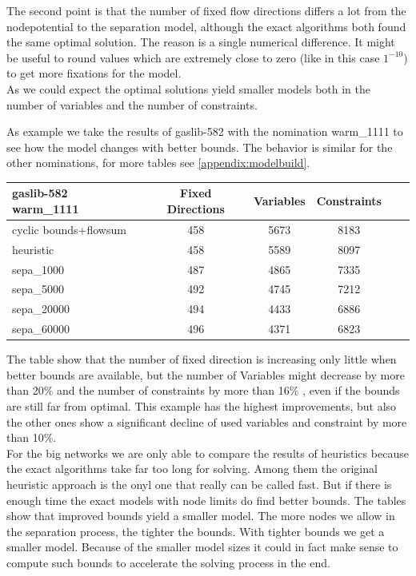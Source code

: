 The second point is that the number of fixed flow directions differs a lot from the nodepotential to the separation 
model, although the exact algorithms both found the same optimal solution. The reason is a single numerical difference. 
It might be useful to round values which are extremely close to zero (like in this case $1^{-10}$) to get more 
fixations for the model.\\

As we could expect the optimal solutions yield smaller models both in the number of variables and the number of 
constraints. 

As example we take the results of gaslib-582 with the nomination warm\_1111 to see how the model changes with better 
bounds. The behavior is similar for the other nominations, for more tables see \ref{appendix:modelbuild}.
\begin{center}
\begin{tabular}{ l | c | c | c | c | c }

\textbf{gaslib-582 warm\_1111} & Fixed Directions &Variables &Constraints\\
\hline
 cyclic bounds+flowsum& 458 & 5673 &8183 \\
 heuristic& 458& 5589 &8097\\
 sepa\_1000& 487 & 4865 & 7335 \\
 sepa\_5000& 492& 4745 & 7212  \\
 sepa\_20000& 494 & 4433& 6886 \\
 sepa\_60000& 496 & 4371 & 6823 \\
\end{tabular} 
\end{center}

The table show that the number of fixed direction is increasing only little when better bounds are available, but the 
number of Variables might decrease by more than 20\% and the number of constraints by more than 16\% , even if the 
bounds are still far from optimal. This example has the highest improvements, but also the other ones show a 
significant decline of used variables and constraint by more than 10\%.\\


For the big networks we are only able to compare the results of heuristics because the exact algorithms take far 
too long for solving. Among them the original heuristic approach is the onyl one that really can be called fast. But if 
there is enough time the exact models with node limits do find better bounds. The tables show that improved bounds 
yield a smaller model. The more nodes we allow in the 
separation process, the tighter the bounds. With tighter bounds we get a smaller model. Because of the smaller model 
sizes it could in fact make sense to compute such bounds to accelerate the solving process in the end. 
